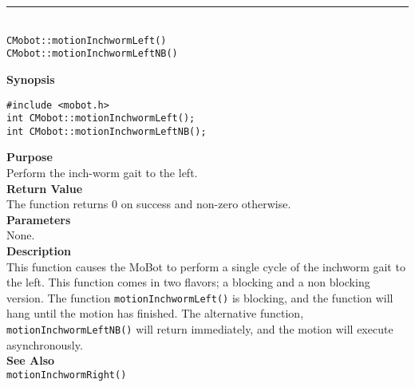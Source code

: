 \noindent
\vspace{5pt}
\rule{4.5in}{0.015in}\\
\noindent
{\LARGE \texttt{CMobot::motionInchwormLeft()}}\\
{\LARGE \texttt{CMobot::motionInchwormLeftNB()}}\\
{}

\noindent
{\bf Synopsis}\\
\begin{verbatim}
#include <mobot.h>
int CMobot::motionInchwormLeft();
int CMobot::motionInchwormLeftNB();
\end{verbatim}

\noindent
{\bf Purpose}\\
Perform the inch-worm gait to the left.\\

\noindent
{\bf Return Value}\\
The function returns 0 on success and non-zero otherwise.\\

\noindent
{\bf Parameters}\\
None.\\

\noindent
{\bf Description}\\
This function causes the MoBot to perform a single cycle of the inchworm gait
to the left. This function comes in two flavors; a blocking and a non blocking
version. The function \texttt{motionInchwormLeft()} is blocking, and the function
will hang until the motion has finished. The alternative function, \texttt{motionInchwormLeftNB()} 
will return immediately, and the motion will execute asynchronously. \\

\noindent
{\bf See Also}\\
\texttt{motionInchwormRight()}

